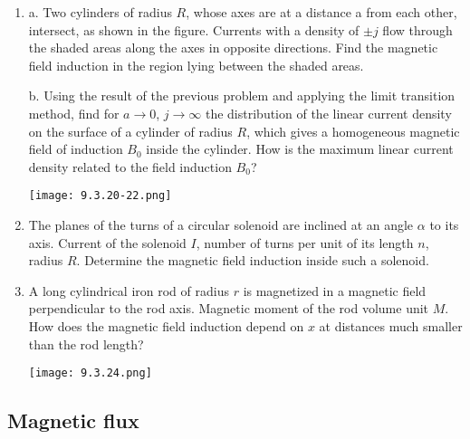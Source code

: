 \documentclass{article}
\begin{document}
\begin{enumerate}[label=9.3.\arabic*]
\item a. Two cylinders of radius $R$, whose axes are at a distance a from each other, intersect, as shown in the figure. Currents with a density of $\pm j$ flow through the shaded areas along the axes in opposite directions. Find the magnetic field induction in the region lying between the shaded areas.


b. Using the result of the previous problem and applying the limit transition method, find for $a \to 0$, $j \to \infty$ the distribution of the linear current density on the surface of a cylinder of radius $R$, which gives a homogeneous magnetic field of induction $B_0$ inside the cylinder. How is the maximum linear current density related to the field induction $B_0$?

\begin{center}
    \texttt{[image: 9.3.20-22.png]}
\end{center}

\item The planes of the turns of a circular solenoid are inclined at an angle $\alpha$ to its axis. Current of the solenoid $I$, number of turns per unit of its length $n$, radius $R$. Determine the magnetic field induction inside such a solenoid.

\item A long cylindrical iron rod of radius $r$ is magnetized in a magnetic field perpendicular to the rod axis. Magnetic moment of the rod volume unit $M$. How does the magnetic field induction depend on $x$ at distances much smaller than the rod length?

\begin{center}
    \texttt{[image: 9.3.24.png]}
\end{center}


\end{enumerate}
\subsection{Magnetic flux}
\end{document}

